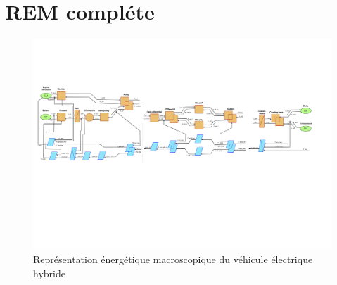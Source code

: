 	\appendix
	\appendixpage
	\addappheadtotoc

\section{REM compléte}\FloatBarrier
\begin{figure}
\begin{center}
	\includegraphics[width=1.1\textwidth,angle=0]{images/REM_sale.png}
	\caption{Représentation énergétique macroscopique du véhicule électrique hybride}\label{img:REM du VEH}
\end{center}
\end{figure}
\FloatBarrier